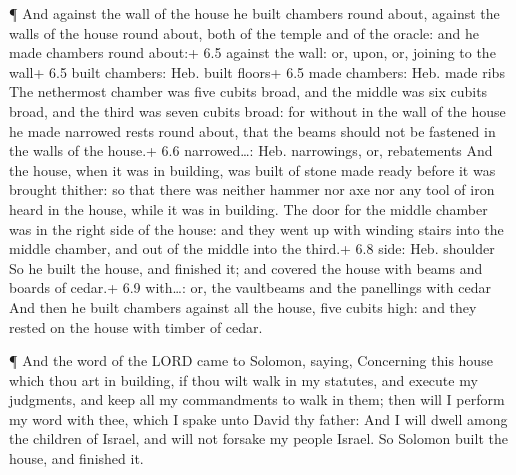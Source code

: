  ¶ And against the wall of the house he built chambers round
about, against the walls of the house round about, both of the temple
and of the oracle: and he made chambers round about:+ 6.5 against the
wall: or, upon, or, joining to the wall+ 6.5 built chambers: Heb. built
floors+ 6.5 made chambers: Heb. made ribs  The nethermost
chamber was five cubits broad, and the middle was six cubits broad, and
the third was seven cubits broad: for without in the wall of the house
he made narrowed rests round about, that the beams should not be
fastened in the walls of the house.+ 6.6 narrowed\ldots: Heb.
narrowings, or, rebatements  And the house, when it was in
building, was built of stone made ready before it was brought thither:
so that there was neither hammer nor axe nor any tool of iron heard in
the house, while it was in building.  The door for the
middle chamber was in the right side of the house: and they went up with
winding stairs into the middle chamber, and out of the middle into the
third.+ 6.8 side: Heb. shoulder  So he built the house, and
finished it; and covered the house with beams and boards of cedar.+ 6.9
with\ldots: or, the vaultbeams and the panellings with cedar
 And then he built chambers against all the house, five
cubits high: and they rested on the house with timber of cedar.

 ¶ And the word of the LORD came to Solomon, saying,
 Concerning this house which thou art in building, if thou
wilt walk in my statutes, and execute my judgments, and keep all my
commandments to walk in them; then will I perform my word with thee,
which I spake unto David thy father:  And I will dwell
among the children of Israel, and will not forsake my people Israel.
 So Solomon built the house, and finished it.

